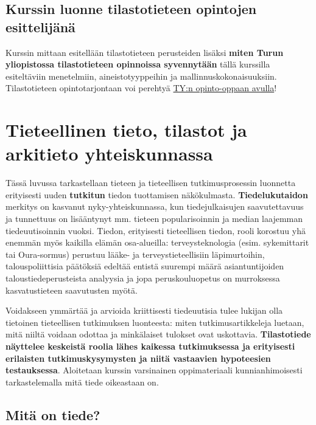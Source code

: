 \documentclass[
]{book}
\begin{document}
\hypertarget{kurssin-luonne-tilastotieteen-opintojen-esittelijuxe4nuxe4}{%
\section{Kurssin luonne tilastotieteen opintojen esittelijänä}\label{kurssin-luonne-tilastotieteen-opintojen-esittelijuxe4nuxe4}}

Kurssin mittaan esitellään tilastotieteen perusteiden lisäksi \textbf{miten Turun yliopistossa tilastotieteen opinnoissa syvennytään} tällä kurssilla esiteltäviin menetelmiin, aineistotyyppeihin ja mallinnuskokonaisuuksiin. Tilastotieteen opintotarjontaan voi perehtyä \href{https://opas.peppi.utu.fi/fi/ohjelma/89589}{TY:n opinto-oppaan avulla}!

\hypertarget{luku2}{%
\chapter{Tieteellinen tieto, tilastot ja arkitieto yhteiskunnassa}\label{luku2}}

Tässä luvussa tarkastellaan tieteen ja tieteellisen tutkimusprosessin luonnetta erityisesti uuden \textbf{tutkitun} tiedon tuottamisen näkökulmasta. \textbf{Tiedelukutaidon} merkitys on kasvanut nyky-yhteiskunnassa, kun tiedejulkaisujen saavutettavuus ja tunnettuus on lisääntynyt mm. tieteen popularisoinnin ja median laajemman tiedeuutisoinnin vuoksi. Tiedon, erityisesti tieteellisen tiedon, rooli korostuu yhä enemmän myös kaikilla elämän osa-alueilla: terveysteknologia (esim. sykemittarit tai Oura-sormus) perustuu lääke- ja terveystieteellisiin läpimurtoihin, talouspoliittisia päätöksiä edeltää entistä suurempi määrä asiantuntijoiden taloustiedeperusteista analyysia ja jopa peruskouluopetus on murroksessa kasvatustieteen saavutusten myötä.

Voidakseen ymmärtää ja arvioida kriittisesti tiedeuutisia tulee lukijan olla tietoinen tieteellisen tutkimuksen luonteesta: miten tutkimusartikkeleja luetaan, mitä niiltä voidaan odottaa ja minkälaiset tulokset ovat uskottavia. \textbf{Tilastotiede näyttelee keskeistä roolia lähes kaikessa tutkimuksessa ja erityisesti erilaisten tutkimuskysymysten ja niitä vastaavien hypoteesien testauksessa}. Aloitetaan kurssin varsinainen oppimateriaali kunnianhimoisesti tarkastelemalla mitä tiede oikeastaan on.

\hypertarget{alaluku21}{%
\section{Mitä on tiede?}\label{alaluku21}}
\end{document}
